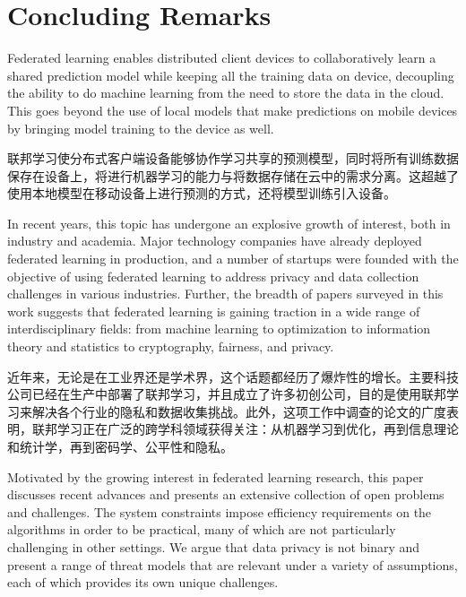 \documentclass[10pt]{article}
\begin{document}
\section{Concluding Remarks}


Federated learning enables distributed client devices to collaboratively learn a shared prediction model while keeping all the training data on device, decoupling the ability to do machine learning from the need to store the data in the cloud. This goes beyond the use of local models that make predictions on mobile devices by bringing model training to the device as well.

联邦学习使分布式客户端设备能够协作学习共享的预测模型，同时将所有训练数据保存在设备上，将进行机器学习的能力与将数据存储在云中的需求分离。这超越了使用本地模型在移动设备上进行预测的方式，还将模型训练引入设备。

In recent years, this topic has undergone an explosive growth of interest, both in industry and academia. Major technology companies have already deployed federated learning in production, and a number of startups were founded with the objective of using federated learning to address privacy and data collection challenges in various industries. Further, the breadth of papers surveyed in this work suggests that federated learning is gaining traction in a wide range of interdisciplinary fields: from machine learning to optimization to information theory and statistics to cryptography, fairness, and privacy. 

近年来，无论是在工业界还是学术界，这个话题都经历了爆炸性的增长。主要科技公司已经在生产中部署了联邦学习，并且成立了许多初创公司，目的是使用联邦学习来解决各个行业的隐私和数据收集挑战。此外，这项工作中调查的论文的广度表明，联邦学习正在广泛的跨学科领域获得关注：从机器学习到优化，再到信息理论和统计学，再到密码学、公平性和隐私。

Motivated by the growing interest in federated learning research, this paper discusses recent advances and presents an extensive collection of open problems and challenges. The system constraints impose efficiency requirements on the algorithms in order to be practical, many of which are not particularly challenging in other settings. We argue that data privacy is not binary and  present a range of threat models that are relevant under a variety of assumptions, each of which provides its own unique challenges.
\end{document}
